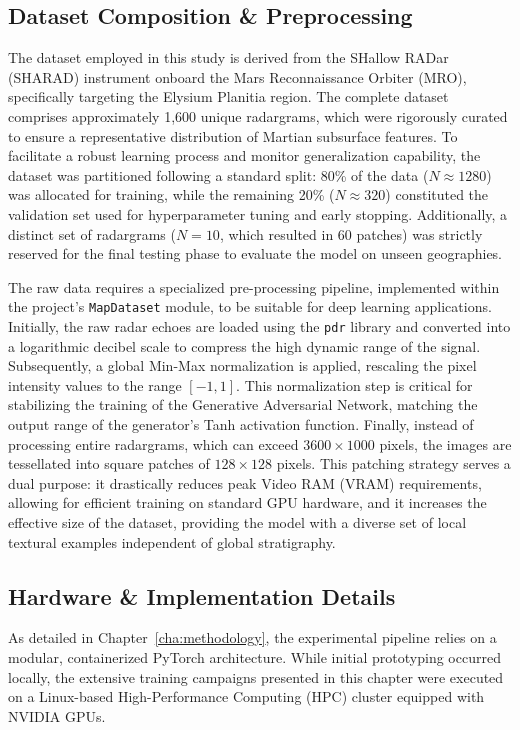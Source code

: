 \subsection{Dataset Composition \& Preprocessing}
\label{subsec:dataset}
The dataset employed in this study is derived from the SHallow RADar (SHARAD) instrument onboard the Mars Reconnaissance Orbiter (MRO), specifically targeting the Elysium Planitia region.
The complete dataset comprises approximately 1,600 unique radargrams, which were rigorously curated to ensure a representative distribution of Martian subsurface features.
To facilitate a robust learning process and monitor generalization capability, the dataset was partitioned following a standard split: 80\% of the data ($N \approx 1280$) was allocated for training, while the remaining 20\% ($N \approx 320$) constituted the validation set used for hyperparameter tuning and early stopping. Additionally, a distinct set of radargrams ($N = 10$, which resulted in 60 patches) was strictly reserved for the final testing phase to evaluate the model on unseen geographies.

The raw data requires a specialized pre-processing pipeline, implemented within the project's \texttt{MapDataset} module, to be suitable for deep learning applications.
Initially, the raw radar echoes are loaded using the \texttt{pdr} library and converted into a logarithmic decibel scale to compress the high dynamic range of the signal. Subsequently, a global Min-Max normalization is applied, rescaling the pixel intensity values to the range $[-1, 1]$.
This normalization step is critical for stabilizing the training of the Generative Adversarial Network, matching the output range of the generator's Tanh activation function.
Finally, instead of processing entire radargrams, which can exceed $3600 \times 1000$ pixels, the images are tessellated into square patches of $128 \times 128$ pixels.
This patching strategy serves a dual purpose: it drastically reduces peak Video RAM (VRAM) requirements, allowing for efficient training on standard GPU hardware, and it increases the effective size of the dataset, providing the model with a diverse set of local textural examples independent of global stratigraphy.

\subsection{Hardware \& Implementation Details}
\label{subsec:hardware}
As detailed in Chapter~\ref{cha:methodology}, the experimental pipeline relies on a modular, containerized PyTorch architecture.
While initial prototyping occurred locally, the extensive training campaigns presented in this chapter were executed on a Linux-based High-Performance Computing (HPC) cluster equipped with NVIDIA GPUs. 

